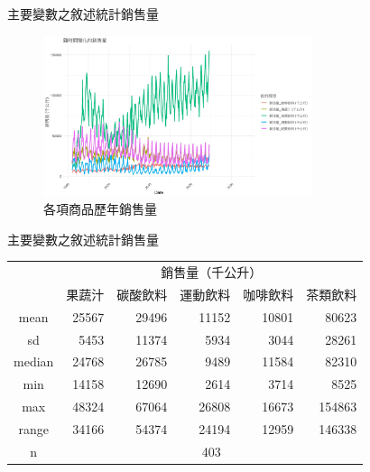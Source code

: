 \documentclass[12pt]{beamer}
\begin{document}
\begin{frame}{主要變數之敘述統計}{銷售量}
	\begin{figure}
		 
  		\centering
		\includegraphics[width=0.7\textwidth]{figures/銷售量.jpg}
		\caption{各項商品歷年銷售量}
	\end{figure}
\end{frame}

\begin{frame}{主要變數之敘述統計}{銷售量}
	\begin{center}
	 \begin{tabular}{ c r r r r r} 
	  \hline
	  & \multicolumn{5}{c}{銷售量（千公升）} \\
	  & 果蔬汁 & 碳酸飲料 & 運動飲料 & 咖啡飲料 & 茶類飲料 \\ 
	  \hline
	  mean & 25567 & 29496 & 11152 & 10801 & 80623 \\ 
	  sd & 5453 & 11374 & 5934 & 3044 & 28261 \\
	  median & 24768 & 26785 & 9489 & 11584 & 82310 \\ 
	  min & 14158 & 12690 & 2614 & 3714 & 8525  \\ 
	  max & 48324 & 67064 & 26808 & 16673 & 154863 \\ 
	  range & 34166 & 54374 & 24194 & 12959 & 146338 \\ 
	  n & \multicolumn{5}{c}{403} \\
	  \hline
	 \end{tabular}
	\end{center}
\end{frame}
\end{document}
